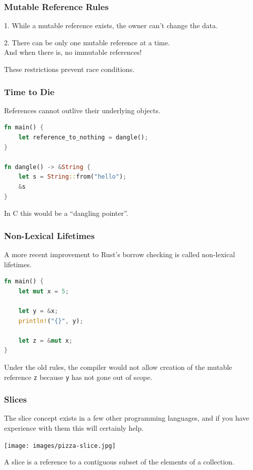 \begin{frame}
\frametitle{Mutable Reference Rules}

1. While a mutable reference exists, the owner can't change the data.

2. There can be only one mutable reference at a time.\\
\quad And when there is, no immutable references!

These restrictions prevent race conditions.

\end{frame}


\begin{frame}[fragile]
\frametitle{Time to Die}

References cannot outlive their underlying objects.

\begin{lstlisting}[language=Rust]
fn main() {
    let reference_to_nothing = dangle();
}

fn dangle() -> &String {
    let s = String::from("hello");
    &s
}
\end{lstlisting} 

In C this would be a ``dangling pointer''.

\end{frame}


\begin{frame}[fragile]
\frametitle{Non-Lexical Lifetimes}

A more recent improvement to Rust's borrow checking is called non-lexical lifetimes.

\begin{lstlisting}[language=Rust]
fn main() {
    let mut x = 5;

    let y = &x;
    println!("{}", y);

    let z = &mut x;
}
\end{lstlisting}

Under the old rules, the compiler would not allow creation of the mutable reference \texttt{z} because \texttt{y} has not gone out of scope.

\end{frame}


\begin{frame}
\frametitle{Slices}

The \alert{slice} concept exists in a few other programming languages, and if you have experience with them this will certainly help.

\begin{center}
	\texttt{[image: images/pizza-slice.jpg]}
\end{center}

A slice is a reference to a contiguous subset of the elements of a collection. 

\end{frame}


